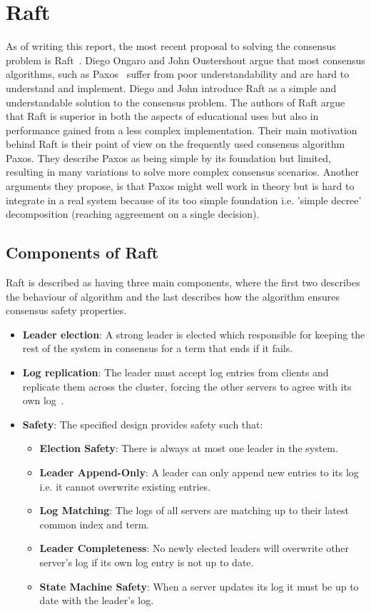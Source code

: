 \section{Raft}
\label{sec:raft}
As of writing this report, the most recent proposal to solving the consensus problem is Raft~\cite{Raft}. Diego Ongaro and John Oustershout argue that most consensus algorithms, such as Paxos~\cite{Paxos} suffer from poor understandability and are hard to understand and implement. Diego and John introduce Raft as a simple and understandable solution to the consensus problem. 
The authors of Raft argue that Raft is superior in both the aspects of educational uses but also in performance gained from a less complex implementation. Their main motivation behind Raft is their point of view on the frequently used consensus algorithm Paxos\cite{Paxos}. They describe Paxos as being simple by its foundation but limited, resulting in many variations to solve more complex consensus scenarios. Another arguments they propose, is that Paxos might well work in theory but is hard to integrate in a real system because of its too simple foundation i.e. 'simple decree' decomposition (reaching aggreement on a single decision).

\subsection{Components of Raft}
Raft is described as having three main components, where the first two describes the behaviour of algorithm and the last describes how the algorithm ensures consensus safety properties.

\begin{itemize}
  \item \textbf{Leader election}: A strong leader is elected which responsible for keeping the rest of the system in consensus for a term that ends if it fails.
  \item \textbf{Log replication}: The leader must accept log entries from clients and replicate them across the cluster, forcing the other servers to agree with its own log~\cite{Raft}.
  \item \textbf{Safety}: The specified design provides safety such that\cite{Raft}:
      \begin{itemize}
        \item \textbf{Election Safety}: There is always at most one leader in the system.
        \item \textbf{Leader Append-Only}: A leader can only append new entries to its log i.e. it cannot overwrite existing entries.
        \item \textbf{Log Matching}: The logs of all servers are matching up to their latest common index and term.
        \item \textbf{Leader Completeness}: No newly elected leaders will overwrite other server's log if its own log entry is not up to date.
        \item \textbf{State Machine Safety}: When a server updates its log it must be up to date with the leader's log.
      \end{itemize}
\end{itemize}

